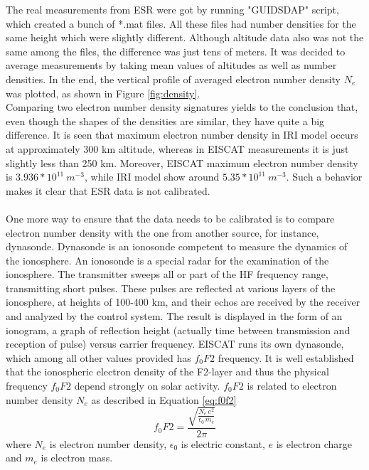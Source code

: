 \documentclass{article}
\begin{document}
The real measurements from ESR were got by running "GUIDSDAP" script, which created a bunch of *.mat files. All these files had number densities for the same height which were slightly different. Although altitude data also was not the same among the files, the difference was just tens of meters. It was decided to average measurements by taking mean values of altitudes as well as number densities. In the end, the vertical profile of averaged electron number density $N_e$ was plotted, as shown in Figure \ref{fig:density}.\\
Comparing two electron number density signatures yields to the conclusion that, even though the shapes of the densities are similar, they have quite a big difference. It is seen that maximum electron number density in IRI model occurs at approximately 300 km altitude, whereas in EISCAT measurements it is just slightly less than 250 km. Moreover, EISCAT maximum electron number density is $3.936*10^{11}\:m^{-3}$, while IRI model show around $5.35*10^{11}\:m^{-3}$. Such a behavior makes it clear that ESR data is not calibrated.\\
\\
One more way to ensure that the data needs to be calibrated is to compare electron number density with the one from another source, for instance, dynasonde. Dynasonde is an ionosonde competent to measure the dynamics of the ionosphere. \cite{Ngdc:2004d} An ionosonde is a special radar for the examination of the ionosphere. The transmitter sweeps all or part of the HF frequency range, transmitting short pulses. These pulses are reflected at various layers of the ionosphere, at heights of 100-400 km, and their echos are received by the receiver and analyzed by the control system. The result is displayed in the form of an ionogram, a graph of reflection height (actually time between transmission and reception of pulse) versus carrier frequency. \cite{Wiki:2012i} EISCAT runs its own dynasonde, which among all other values provided has $f_0F2$ frequency. It is well established that the ionospheric electron density of the F2-layer and thus the physical frequency $f_0F2$ depend strongly on solar activity. \cite{XenosKourisZolesi:1996} $f_0F2$ is related to electron number density $N_e$ as described in Equation \ref{eq:f0f2}
\begin{equation}
\label{eq:f0f2}
f_0F2=\frac{\sqrt{\frac{N_e\,e^2}{\epsilon_0\,m_e}}}{2\pi}
\end{equation}
where $N_e$ is electron number density, $\epsilon_0$ is electric constant, $e$ is electron charge and $m_e$ is electron mass.\\
\end{document}

